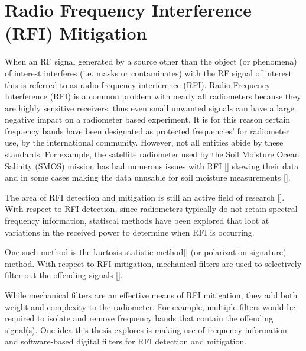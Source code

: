 \section{Radio Frequency Interference (RFI) Mitigation}
When an RF signal generated by a source other than the object (or phenomena) of interest interferes (i.e. masks or contaminates) with the RF signal of interest this is referred to as radio frequency interference (RFI).  Radio Frequency Interference (RFI) is a common problem with nearly all radiometers because they are highly sensitive receivers, thus even small unwanted signals can have a large negative impact on a radiometer based experiment.  It is for this reason certain frequency bands have been designated as protected frequencies' for radiometer use, by the international community.  However, not all entities abide by these standards.  For example, the satellite radiometer used by the Soil Moisture Ocean Salinity (SMOS) mission has had numerous issues with RFI [\cite{Kerr}] skewing their data and in some cases making the data unusable for soil moisture measurements [\cite{Richaume}].  

The area of RFI detection and mitigation is still an active field of research [\cite{Forte}].  With respect to RFI detection, since radiometers typically do not retain spectral frequency information, statiscal methods have been explored that loot at variations in the received power to determine when RFI is occurring.

One such method is the kurtosis statistic method[\cite{DeRoo}] (or polarization signature) method.  With respect to RFI mitigation, mechanical filters are used to selectively filter out the offending signals [\cite{DeRooRFI}].  

While mechanical filters are an effective means of RFI mitigation, they add both weight and complexity to the radiometer.  For example, multiple filters would be required to isolate and remove frequency bands that contain the offending signal(s).  One idea this thesis explores is making use of frequency information and software-based digital filters for RFI detection and mitigation.



